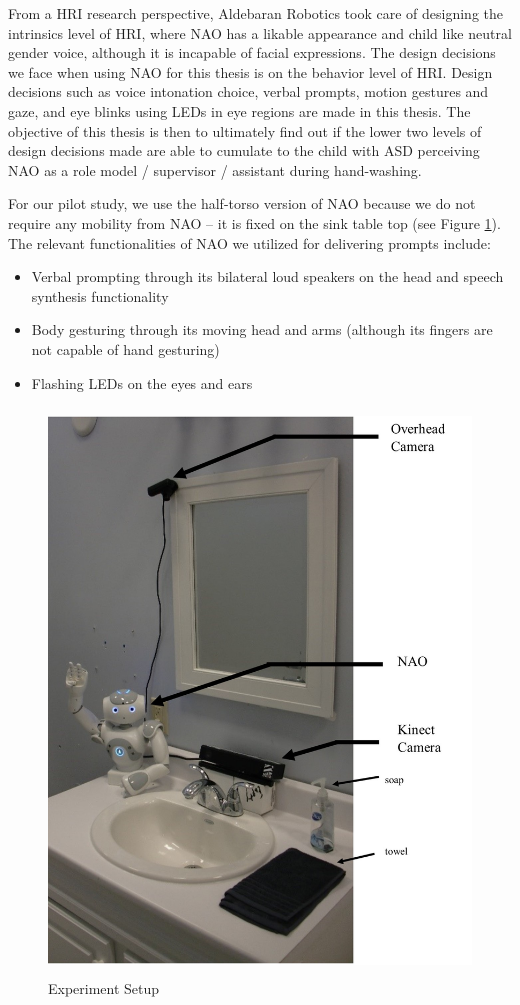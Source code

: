 \documentclass{ut-thesis}
\begin{document}
From a HRI research perspective, Aldebaran Robotics took care of designing the intrinsics level of HRI, where NAO has a likable appearance and child like neutral gender voice, although it is incapable of facial expressions.  The design decisions we face when using NAO for this thesis is on the behavior level of HRI.  Design decisions such as voice intonation choice, verbal prompts, motion gestures and gaze, and eye blinks using LEDs in eye regions are made in this thesis.  The objective of this thesis is then to ultimately find out if the lower two levels of design decisions made are able to cumulate to the child with ASD perceiving NAO as a role model / supervisor / assistant during hand-washing.

For our pilot study, we use the half-torso version of NAO because we do not require any mobility from NAO -- it is fixed on the sink table top (see Figure \ref{fig:ExpSetup}).  The relevant functionalities of NAO we utilized for delivering prompts include:
\begin{itemize}
	\item Verbal prompting through its bilateral loud speakers on the head and speech synthesis functionality
	\item Body gesturing through its moving head and arms (although its fingers are not capable of hand gesturing)
	\item Flashing LEDs on the eyes and ears
\end{itemize}
\begin{figure} [h]
	\centering
	\includegraphics[height=15cm, keepaspectratio]{./img/exp_setup_labeled.jpg}
	\caption{Experiment Setup}
	\label{fig:ExpSetup}
\end{figure}
\end{document}
